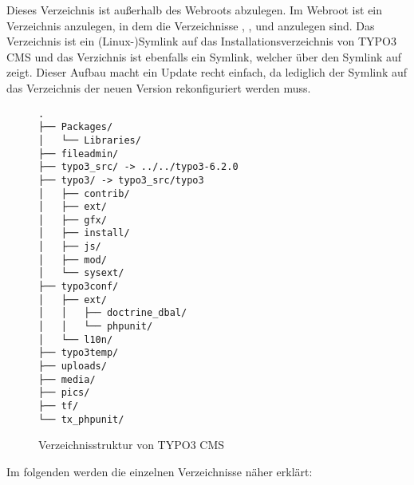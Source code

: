 Dieses Verzeichnis ist außerhalb des Webroots abzulegen. Im Webroot ist ein Verzeichnis  anzulegen, in dem die Verzeichnisse , ,  und  anzulegen sind. Das Verzeichnis  ist ein (Linux-)Symlink auf das Installationsverzeichnis von TYPO3 CMS und das Verzichnis  ist ebenfalls ein Symlink, welcher über den Symlink  auf  zeigt. Dieser Aufbau macht ein Update recht einfach, da lediglich der Symlink  auf das Verzeichnis der neuen Version rekonfiguriert werden muss.

\begin{figure}[H]
\begin{Verbatim}[samepage=true]
.
├── Packages/
│   └── Libraries/
├── fileadmin/
├── typo3_src/ -> ../../typo3-6.2.0
├── typo3/ -> typo3_src/typo3
│   ├── contrib/
│   ├── ext/
│   ├── gfx/
│   ├── install/
│   ├── js/
│   ├── mod/
│   └── sysext/
├── typo3conf/
│   ├── ext/
│   │   ├── doctrine_dbal/
│   │   └── phpunit/
│   └── l10n/
├── typo3temp/
├── uploads/
├── media/
├── pics/
├── tf/
└── tx_phpunit/
\end{Verbatim}
\caption{Verzeichnisstruktur von TYPO3 CMS}
\label{pic:typo3FolderStructure}
\end{figure}
Im folgenden werden die einzelnen Verzeichnisse näher erklärt:

